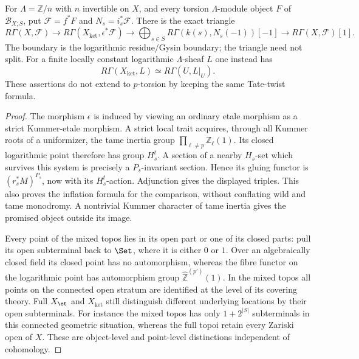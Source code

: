 For $\Lambda=\mathbb Z/n$ with $n$ invertible on $X$, and every
torsion $\Lambda$-module object $F$ of $\mathcal B_{X;S}$, put
$\mathcal F=f^*F$ and $N_s=i_s^*\mathcal F$. There is the exact
triangle
\[
 R\Gamma(X,\mathcal F)\longrightarrow
 R\Gamma(X_{\mathrm{ket}},\epsilon^*\mathcal F)
 \longrightarrow
 \bigoplus_{s\in S}R\Gamma(k(s),N_s(-1))[-1]
 \longrightarrow R\Gamma(X,\mathcal F)[1].                 \tag{B.9.1}
\]
The boundary is the logarithmic residue/Gysin boundary; the
triangle need not split. For a finite locally constant
logarithmic $\Lambda$-sheaf $L$ one instead has
\[
 R\Gamma(X_{\mathrm{ket}},L)\simeq R\Gamma(U,L|_U).
                                                               \tag{B.9.2}
\]
These assertions do not extend to $p$-torsion by keeping the
same Tate-twist formula.

\begin{proof}
The morphism $\epsilon$ is induced by viewing an ordinary
etale morphism as a strict Kummer-etale morphism. A strict
local trait acquires, through all Kummer roots of a
uniformizer, the tame inertia group
$\prod_{\ell\ne p}\mathbb Z_\ell(1)$. Its closed logarithmic
point therefore has group $H_s^t$. A section of a nearby
$H_s$-set which survives this system is precisely a
$P_s$-invariant section. Hence its gluing functor is
$(r_s^*M)^{P_s}$, now with its $H_s^t$-action. Adjunction gives
the displayed triples. This also proves the inflation formula
for the comparison, without conflating wild and tame
monodromy. A nontrivial Kummer character of tame inertia gives
the promised object outside its image.

Every point of the mixed topos lies in its open part or one
of its closed parts: pull its open subterminal back to
$\Set$, where it is either $0$ or $1$. Over an algebraically
closed field its closed point has no automorphism, whereas
the fibre functor on the logarithmic point has automorphism
group $\widehat{\mathbb Z}^{(p')}(1)$. In the mixed topos all
points on the connected open stratum are identified at the
level of its covering theory. Full $X_{\et}$ and
$X_{\mathrm{ket}}$ still distinguish different underlying
locations by their open subterminals. For instance the mixed
topos has only $1+2^{|S|}$ subterminals in this connected
geometric situation, whereas the full topoi retain every
Zariski open of $X$. These are object-level and point-level
distinctions independent of cohomology.


\end{proof}
